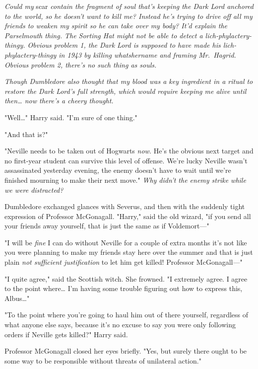 \emph{Could my} scar \emph{contain the fragment of soul that's keeping the Dark 
Lord anchored to the world, so he doesn't want to kill me? Instead he's trying 
to drive off all my friends to weaken my spirit so he can take over my body? 
It'd explain the Parselmouth thing. The Sorting Hat might not be able to detect 
a lich-phylactery-thingy. Obvious problem 1, the Dark Lord is supposed to have 
made his lich-phylactery-thingy in 1943 by killing whatshername and framing 
Mr.~Hagrid. Obvious problem 2, there's no such thing as souls.}

\emph{Though Dumbledore also thought that my blood was a key ingredient in a 
ritual to restore the Dark Lord's full strength, which would require keeping me 
alive until then{\ldots} now there's a cheery thought.}

"Well{\ldots}" Harry said. "I'm sure of one thing."

"And that is?"

"Neville needs to be taken out of Hogwarts \emph{now.} He's the obvious next 
target and no first-year student can survive this level of offense. We're lucky 
Neville wasn't assassinated yesterday evening, the enemy doesn't have to wait 
until we're finished mourning to make their next move." \emph{Why didn't the 
enemy strike while we were distracted?}

Dumbledore exchanged glances with Severus, and then with the suddenly tight 
expression of Professor McGonagall. "Harry," said the old wizard, "if you send 
all your friends away yourself, that is just the same as if Voldemort---"

"I will be \emph{fine} I can do without Neville for a couple of extra months 
it's not like you were planning to make my friends stay here over the summer 
and that is just plain \emph{not sufficient justification} to let him get 
killed! Professor McGonagall---"

"I quite agree," said the Scottish witch. She frowned. "I extremely agree. I 
agree to the point where{\ldots} I'm having some trouble figuring out how to 
express this, Albus{\ldots}"

"To the point where you're going to haul him out of there yourself, regardless 
of what anyone else says, because it's no excuse to say you were only following 
orders if Neville gets killed?" Harry said.

Professor McGonagall closed her eyes briefly. "Yes, but surely there ought to 
be some way to be responsible without threats of unilateral action."

